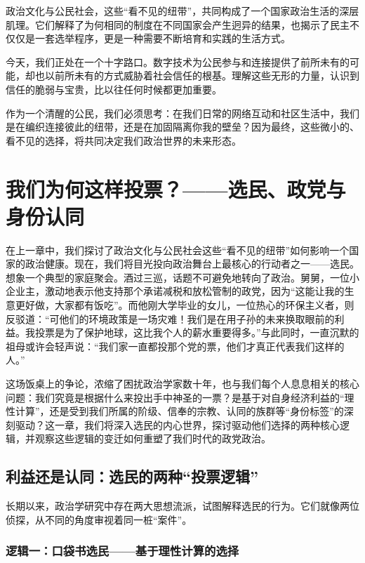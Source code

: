 \documentclass[a5paper, 11pt, openany]{ctexbook}
\begin{document}
政治文化与公民社会，这些“看不见的纽带”，共同构成了一个国家政治生活的深层肌理。它们解释了为何相同的制度在不同国家会产生迥异的结果，也揭示了民主不仅仅是一套选举程序，更是一种需要不断培育和实践的生活方式。

今天，我们正处在一个十字路口。数字技术为公民参与和连接提供了前所未有的可能，却也以前所未有的方式威胁着社会信任的根基。理解这些无形的力量，认识到信任的脆弱与宝贵，比以往任何时候都更加重要。

作为一个清醒的公民，我们必须思考：在我们日常的网络互动和社区生活中，我们是在编织连接彼此的纽带，还是在加固隔离你我的壁垒？因为最终，这些微小的、看不见的选择，将共同决定我们政治世界的未来形态。

\chapter{我们为何这样投票？——选民、政党与身份认同}

在上一章中，我们探讨了政治文化与公民社会这些“看不见的纽带”如何影响一个国家的政治健康。现在，我们将目光投向政治舞台上最核心的行动者之一——选民。想象一个典型的家庭聚会。酒过三巡，话题不可避免地转向了政治。舅舅，一位小企业主，激动地表示他支持那个承诺减税和放松管制的政党，因为“这能让我的生意更好做，大家都有饭吃”。而他刚大学毕业的女儿，一位热心的环保主义者，则反驳道：“可他们的环境政策是一场灾难！我们是在用子孙的未来换取眼前的利益。我投票是为了保护地球，这比我个人的薪水重要得多。”与此同时，一直沉默的祖母或许会轻声说：“我们家一直都投那个党的票，他们才真正代表我们这样的人。”

这场饭桌上的争论，浓缩了困扰政治学家数十年，也与我们每个人息息相关的核心问题：我们究竟是根据什么来投出手中神圣的一票？是基于对自身经济利益的“理性计算”，还是受到我们所属的阶级、信奉的宗教、认同的族群等“身份标签”的深刻驱动？这一章，我们将深入选民的内心世界，探讨驱动他们选择的两种核心逻辑，并观察这些逻辑的变迁如何重塑了我们时代的政党政治。

\section{利益还是认同：选民的两种“投票逻辑”}

长期以来，政治学研究中存在两大思想流派，试图解释选民的行为。它们就像两位侦探，从不同的角度审视着同一桩“案件”。

\subsection{逻辑一：口袋书选民——基于理性计算的选择}
\end{document}
